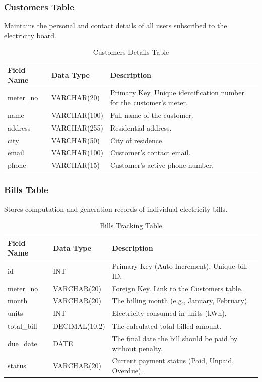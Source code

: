 \documentclass[a4paper,12pt]{article}
\begin{document}
\subsubsection*{Customers Table}
Maintains the personal and contact details of all users subscribed to the electricity board.
\begin{table}[H]
\centering
\begin{tabularx}{\textwidth}{|l|l|X|}
\hline
\textbf{Field Name} & \textbf{Data Type} & \textbf{Description} \\ \hline
meter\_no & VARCHAR(20) & Primary Key. Unique identification number for the customer's meter. \\ \hline
name & VARCHAR(100) & Full name of the customer. \\ \hline
address & VARCHAR(255) & Residential address. \\ \hline
city & VARCHAR(50) & City of residence. \\ \hline
email & VARCHAR(100) & Customer's contact email. \\ \hline
phone & VARCHAR(15) & Customer's active phone number. \\ \hline
\end{tabularx}
\caption{Customers Details Table}
\end{table}

\subsubsection*{Bills Table}
Stores computation and generation records of individual electricity bills.
\begin{table}[H]
\centering
\begin{tabularx}{\textwidth}{|l|l|X|}
\hline
\textbf{Field Name} & \textbf{Data Type} & \textbf{Description} \\ \hline
id & INT & Primary Key (Auto Increment). Unique bill ID. \\ \hline
meter\_no & VARCHAR(20) & Foreign Key. Link to the Customers table. \\ \hline
month & VARCHAR(20) & The billing month (e.g., January, February). \\ \hline
units & INT & Electricity consumed in units (kWh). \\ \hline
total\_bill & DECIMAL(10,2) & The calculated total billed amount. \\ \hline
due\_date & DATE & The final date the bill should be paid by without penalty. \\ \hline
status & VARCHAR(20) & Current payment status (Paid, Unpaid, Overdue). \\ \hline
\end{tabularx}
\caption{Bills Tracking Table}
\end{table}
\end{document}
